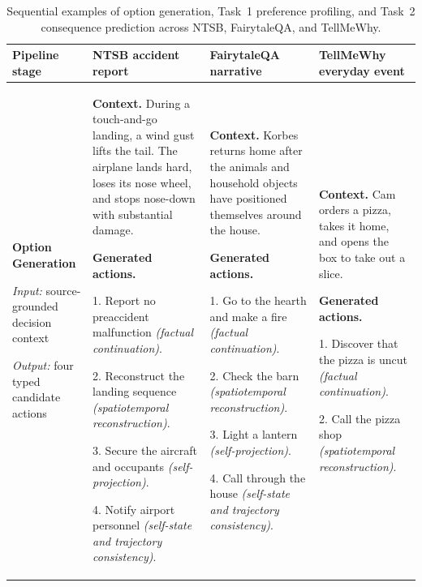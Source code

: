 \documentclass[pdflatex,sn-mathphys-num]{sn-jnl}%
\theoremstyle{thmstyleone}%
\theoremstyle{thmstyletwo}%
\theoremstyle{thmstylethree}%
\begin{document}
\begin{table}
\centering
\caption{Sequential examples of option generation, Task~1 preference profiling, and Task~2 consequence prediction across NTSB, FairytaleQA, and TellMeWhy.}
\label{tab:worked-task-example}
\footnotesize
\setlength{\tabcolsep}{3.5pt}
\renewcommand{\arraystretch}{1.10}
\begin{tabular}{p{}p{}p{}p{}}
\toprule
\textbf{Pipeline stage} &
\textbf{NTSB accident report} &
\textbf{FairytaleQA narrative} &
\textbf{TellMeWhy everyday event} \\
\midrule
\raggedright\textbf{Option Generation}\par
\textit{Input:} source-grounded decision context\par
\textit{Output:} four typed candidate actions
&
\textbf{Context.} During a touch-and-go landing, a wind gust lifts the tail. The airplane lands hard, loses its nose wheel, and stops nose-down with substantial damage.\par
\textbf{Generated actions.}\par
1. Report no preaccident malfunction \textit{(factual continuation)}.\par
2. Reconstruct the landing sequence \textit{(spatiotemporal reconstruction)}.\par
3. Secure the aircraft and occupants \textit{(self-projection)}.\par
4. Notify airport personnel \textit{(self-state and trajectory consistency)}.
&
\textbf{Context.} Korbes returns home after the animals and household objects have positioned themselves around the house.\par
\textbf{Generated actions.}\par
1. Go to the hearth and make a fire \textit{(factual continuation)}.\par
2. Check the barn \textit{(spatiotemporal reconstruction)}.\par
3. Light a lantern \textit{(self-projection)}.\par
4. Call through the house \textit{(self-state and trajectory consistency)}.
&
\textbf{Context.} Cam orders a pizza, takes it home, and opens the box to take out a slice.\par
\textbf{Generated actions.}\par
1. Discover that the pizza is uncut \textit{(factual continuation)}.\par
2. Call the pizza shop \textit{(spatiotemporal reconstruction)}.\par

\end{tabular}
\end{table}
\end{document}
